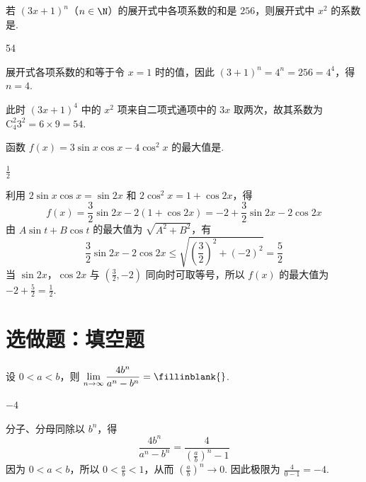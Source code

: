\begin{problem}
若 \((3x+1)^n\)（\(n \in \N\)）的展开式中各项系数的和是 \(256\)，则展开式中 \(x^2\) 的系数是\fillinblank{}.
\end{problem}

\begin{answer}
    54
\end{answer}

\begin{solution}
展开式各项系数的和等于令 \(x=1\) 时的值，因此
\((3+1)^n=4^n=256=4^4\)，得 \(n=4\).

此时 \((3x+1)^4\) 中的 \(x^2\) 项来自二项式通项中的 \(3x\) 取两次，故其系数为
\(\mathrm C_4^2 3^2=6\times9=54\).
\end{solution}

\begin{problem}
函数 \(f(x)=3\sin x\cos x-4\cos^2 x\) 的最大值是\fillinblank{}.
\end{problem}

\begin{answer}
\(\frac{1}{2}\)
\end{answer}

\begin{solution}
利用 \(2\sin x\cos x=\sin 2x\) 和 \(2\cos^2x=1+\cos 2x\)，得
\[
f(x)=\frac32\sin 2x-2(1+\cos 2x)=-2+\frac32\sin 2x-2\cos 2x
\]
由 \(A\sin t+B\cos t\) 的最大值为 \(\sqrt{A^2+B^2}\)，有
\[
\frac32\sin 2x-2\cos 2x\leqslant\sqrt{\left(\frac32\right)^2+(-2)^2}=\frac52
\]
当 \(\sin 2x\)，\(\cos 2x\) 与 \(\left(\frac32,-2\right)\) 同向时可取等号，所以 \(f(x)\) 的最大值为 \(-2+\frac52=\frac12\).
\end{solution}

\section{选做题：填空题}

\begin{problem}[A]
设 \(0<a<b\)，则 \(\displaystyle\lim_{n\to\infty}\frac{4b^n}{a^n-b^n}=\fillinblank{}\).
\end{problem}

\begin{answer}
\(-4\)
\end{answer}

\begin{solution}
分子、分母同除以 \(b^n\)，得
\[
\frac{4b^n}{a^n-b^n}=\frac{4}{\left(\frac{a}{b}\right)^n-1}
\]
因为 \(0<a<b\)，所以 \(0<\frac ab<1\)，从而 \(\left(\frac ab\right)^n\to0\). 因此极限为 \(\frac{4}{0-1}=-4\).
\end{solution}

